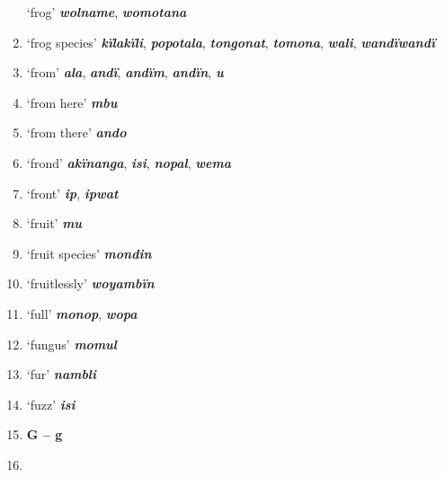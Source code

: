\begin{enumerate}[noitemsep, label={}, align=left, widest=190, labelsep=1ex,leftmargin=*,itemindent=-10pt]
‘frog’ \textbf{\textit{wolname}}, \textbf{\textit{womotana}} \item
‘frog species’ \textbf{\textit{kïlakïli}}, \textbf{\textit{popotala}}, \textbf{\textit{tongonat}}, \textbf{\textit{tomona}}, \textbf{\textit{wali}}, \textbf{\textit{wandïwandï}} \item
‘from’ \textbf{\textit{ala}}, \textbf{\textit{andï}}, \textbf{\textit{andïm}}, \textbf{\textit{andïn}}, \textbf{\textit{u}} \item
‘from here’ \textbf{\textit{mbu}} \item
‘from there’ \textbf{\textit{ando}} \item
‘frond’ \textbf{\textit{akïnanga}}, \textbf{\textit{isi}}, \textbf{\textit{nopal}}, \textbf{\textit{wema}} \item
‘front’ \textbf{\textit{ip}}, \textbf{\textit{ipwat}} \item
‘fruit’ \textbf{\textit{mu}} \item
‘fruit species’ \textbf{\textit{mondin}} \item
‘fruitlessly’ \textbf{\textit{woyambïn}} \item
‘full’ \textbf{\textit{monop}}, \textbf{\textit{wopa}} \item
‘fungus’ \textbf{\textit{momul}} \item
‘fur’ \textbf{\textit{nambli}} \item
‘fuzz’ \textbf{\textit{isi}}\\ \item

\noindent \textbf{G – g}\\ \item


\end{enumerate}
